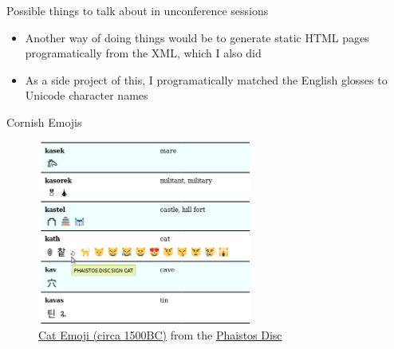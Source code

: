 \documentclass[handout]{beamer}
\begin{document}
 \begin{frame}[plain]{Possible things to talk about in unconference sessions}
 \begin{itemize}
 \item Another way of doing things would be to generate static HTML pages programatically from the XML, which I also did
\item As a side project of this, I programatically matched the English glosses to Unicode character names
\end{itemize}
\end{frame}
\begin{frame}[plain]{Cornish Emojis}
\begin{figure}
 \begin{center}
\includegraphics[width=7cm]{emojis_example.png}
 \end{center}
 \caption{\href{https://unicode-table.com/101ec}{Cat Emoji (circa 1500BC)} from the \href{https://unicode-table.com/en/blocks/phaistos-disc/}{Phaistos Disc}}
 \label{fig:emojis}
\end{figure}
\end{frame}
\end{document}
